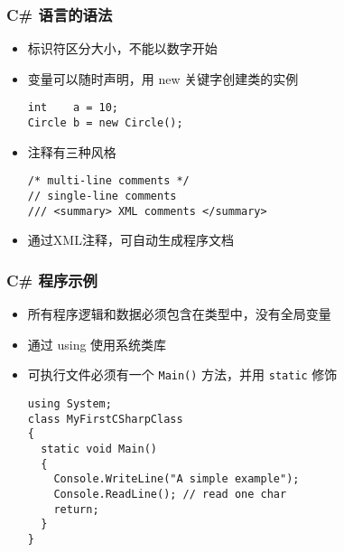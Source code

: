 
\begin{frame}[fragile]
\frametitle{C\# 语言的语法}
\begin{itemize}
\item 标识符区分大小，不能以数字开始
\item 变量可以随时声明，用 new 关键字创建类的实例
\begin{lstlisting}
int    a = 10;
Circle b = new Circle();
\end{lstlisting}
\item 注释有三种风格
\begin{lstlisting}
/* multi-line comments */
// single-line comments
/// <summary> XML comments </summary>
\end{lstlisting}
\item  通过XML注释，可自动生成程序文档

\end{itemize}
\end{frame}


\begin{frame}[fragile]
\frametitle{C\# 程序示例}
\begin{itemize}
\item 所有程序逻辑和数据必须包含在类型中，没有全局变量

\item 通过 using 使用系统类库

\item 可执行文件必须有一个 \texttt{Main()} 方法，并用 \texttt{static} 修饰

\begin{lstlisting}
using System;
class MyFirstCSharpClass
{
  static void Main()
  {
    Console.WriteLine("A simple example");
    Console.ReadLine(); // read one char
    return;
  }
}
\end{lstlisting}

\end{itemize}
\end{frame}


